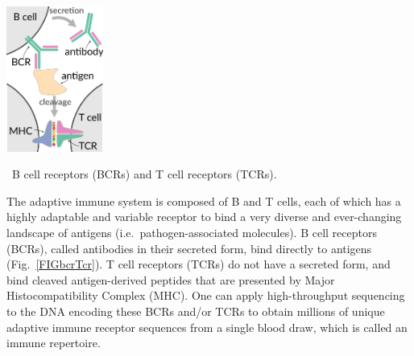\documentclass[nobib]{tufte-handout}
\begin{document}
\begin{marginfigure}[0.in]%
\begin{centering}
  \includegraphics[width=1.25in]{bcr-tcr}
\end{centering}
  \caption{\
    B cell receptors (BCRs) and T cell receptors (TCRs).
    }
  \label{FIGbcrTcr}
\end{marginfigure}%

The adaptive immune system is composed of B and T cells, each of which has a highly adaptable and variable receptor to bind a very diverse and ever-changing landscape of antigens (i.e.\ pathogen-associated molecules).
B cell receptors (BCRs), called antibodies in their secreted form, bind directly to antigens (Fig.~\ref{FIGbcrTcr}).
T cell receptors (TCRs) do not have a secreted form, and bind cleaved antigen-derived peptides that are presented by Major Histocompatibility Complex (MHC).
One can apply high-throughput sequencing to the DNA encoding these BCRs and/or TCRs to obtain millions of unique adaptive immune receptor sequences from a single blood draw, which is called an immune repertoire.
\end{document}
